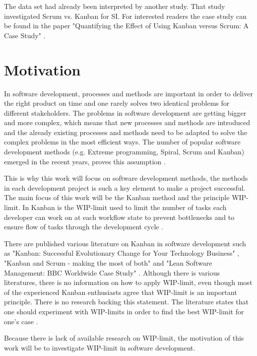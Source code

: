 \documentclass[UKenglish]{ifimaster}  %
\begin{document}
The data set had already been interpreted by another study. That study investigated Scrum vs. Kanban for SI. For interested readers the case study can be found in the paper "Quantifying the Effect of Using Kanban versus Scrum: A Case Study" \parencite{Dag}. 

\section{Motivation}
In software development, processes and methods are important in order to deliver the right product on time and one rarely solves two identical problems for different stakeholders. The problems in software development are getting bigger and more complex, which means that new processes and methods are introduced and the already existing processes and methods need to be adapted to solve the complex problems in the most efficient ways.  The number of popular software development methods  (e.g. Extreme programming, Spiral, Scrum and Kanban) emerged in the recent years, proves this assumption \parencite{gandomani2013important} \parencite{ikonen2010exploring}.

This is why this work will focus on software development methods, the methods in each development project is such a key element to make a project successful. The main focus of this work will be the Kanban method and the principle WIP-limit. In Kanban is the WIP-limit used to  limit the number of tasks each developer can work on at each workflow state to prevent bottlenecks and to ensure flow of tasks through the development cycle \parencite{gandomani2013important} \parencite{ikonen2010exploring}.

There are published various literature on Kanban in software development such as "Kanban: Successful Evolutionary Change for Your Technology Business" \parencite{0984521402}, "Kanban and Scrum - making the most of both"  \parencite{Kniberg} and "Lean Software Management: BBC Worldwide Case Study" \parencite{Joyce}. Although there is various literatures, there is no information on how to apply WIP-limit, even though most of the experienced Kanban enthusiasts agree that WIP-limit is an important principle.  There is no research backing this statement.  The literature states that one should experiment with WIP-limits in order to find the best WIP-limit for one's case \parencite{Ikonen} \parencite{Kniberg}.

Because there is lack of available research on WIP-limit, the motivation of this work will be to investigate WIP-limit in software development.
\end{document}
